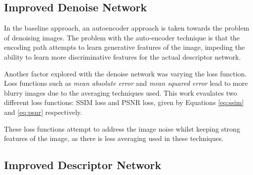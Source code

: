 \documentclass[10pt,twocolumn,letterpaper]{article}
\begin{document}



\subsection{Improved Denoise Network}
In the baseline approach, an autoencoder approach is taken towards the problem of denoising images. The problem with the auto-encoder technique is that the encoding path attempts to learn generative features of the image, impeding the ability to learn more discriminative features for the actual descriptor network. 


Another factor explored with the denoise network was varying the loss function. Loss functions such as \textit{mean absolute error} and  \textit{mean squared error} lead to more blurry images due to the averaging techniques used. This work evaulates two different loss functions: SSIM loss and PSNR loss, given by Equations \ref{eq:ssim} and \ref{eq:psnr} respectively. 


These loss functions attempt to address the image noise whilst keeping strong features of the image, as there is less averaging used in these techniques. 

\subsection{Improved Descriptor Network}
\end{document}
